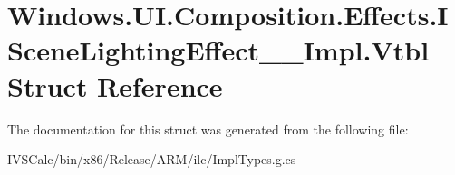 \hypertarget{struct_windows_1_1_u_i_1_1_composition_1_1_effects_1_1_i_scene_lighting_effect_____impl_1_1_vtbl}{}\section{Windows.\+U\+I.\+Composition.\+Effects.\+I\+Scene\+Lighting\+Effect\+\_\+\+\_\+\+Impl.\+Vtbl Struct Reference}
\label{struct_windows_1_1_u_i_1_1_composition_1_1_effects_1_1_i_scene_lighting_effect_____impl_1_1_vtbl}


The documentation for this struct was generated from the following file\+:\begin{DoxyCompactItemize}
\item 
I\+V\+S\+Calc/bin/x86/\+Release/\+A\+R\+M/ilc/Impl\+Types.\+g.\+cs\end{DoxyCompactItemize}

